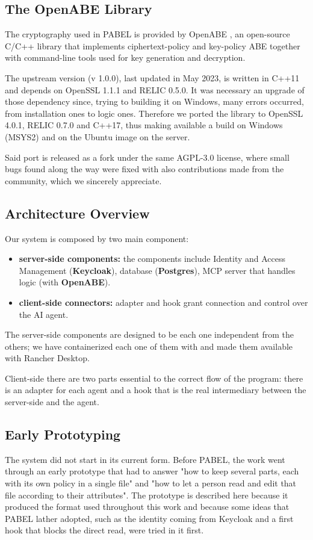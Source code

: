 \subsection{The OpenABE Library}\label{sec:openabe}
The cryptography used in PABEL is provided by OpenABE \cite{openabe}, an open-source C/C++ library that implements ciphertext-policy and key-policy ABE together with command-line tools used for key generation and decryption.

The upstream version (v 1.0.0), last updated in May 2023, is written in C++11 and depends on OpenSSL 1.1.1 and RELIC 0.5.0.
It was necessary an upgrade of those dependency since, trying to building it on Windows, many errors occurred, from installation ones to logic ones.
Therefore we ported the library to OpenSSL 4.0.1, RELIC 0.7.0 and C++17, thus making available a build on Windows (MSYS2) and on the Ubuntu image on the server.

Said port is released as a fork \cite{openabefork} under the same AGPL-3.0 license, where small bugs found along the way were fixed with also contributions made from the community, which we sincerely appreciate. 

\subsection{Architecture Overview}
Our system is composed by two main component:
\begin{itemize}
    \item \textbf{server-side components:} the components include Identity and Access Management (\textbf{Keycloak}), database (\textbf{Postgres}), MCP server that handles logic (with \textbf{OpenABE}).
    \item \textbf{client-side connectors:} adapter and hook grant connection and control over the AI agent.
\end{itemize}
The server-side components are designed to be each one independent from the others; we have containerized each one of them with  and made them available with Rancher Desktop.

Client-side there are two parts essential to the correct flow of the program: there is an adapter for each agent and a hook that is the real intermediary between the server-side and the agent.
\subsection{Early Prototyping}
The system did not start in its current form. Before PABEL, the work went through an early prototype that had to answer "how to keep several parts, each with its own policy in a single file" and "how to let a person read and edit that file according to their attributes".
The prototype is described here because it produced the format used throughout this work and because some ideas that PABEL lather adopted, such as the identity coming from Keycloak and a first hook that blocks the direct read, were tried in it first.

